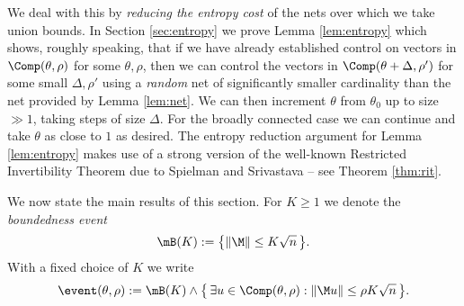 \documentclass[aop,preprint]{imsart}
\theoremstyle{plain}
\newtheorem{proposition}[theorem]{Proposition}
\theoremstyle{definition}
\theoremstyle{remark}
\numberwithin{equation}{section}
\numberwithin{theorem}{section}
\def \tran {\mathsf{T}}
\begin{document}
We deal with this by \emph{reducing the entropy cost} of the nets over which we take union bounds.
In Section \ref{sec:entropy} we prove Lemma \ref{lem:entropy} which shows, roughly speaking, that if we have already established control on vectors in $\Comp(\theta,\rho)$ for some $\theta,\rho$, then we can control the vectors in $\Comp(\theta+\Delta,\rho')$ for some small $\Delta, \rho'$ using a \emph{random} net of significantly smaller cardinality than the net provided by Lemma \ref{lem:net}.
We can then increment $\theta$ from $\theta_0$ up to size $\gg 1$, taking steps of size $\Delta$.
For the broadly connected case we can continue and take $\theta$ as close to $1$ as desired.
The entropy reduction argument for Lemma \ref{lem:entropy} makes use of a strong version of the well-known Restricted Invertibility Theorem due to Spielman and Srivastava -- see Theorem \ref{thm:rit}.

We now state the main results of this section.
For $K\ge1$ we denote the \emph{boundedness event}
\begin{equation}	\label{event:bdd}
\mB(K):= \big\{\|\M\|\le K\sqrt{n}\,\big\}.
\end{equation}
With a fixed choice of $K$ we write
\begin{equation}	\label{def:eventcomp}
\event(\theta,\rho):= \mB(K) \wedge \big\{\, \exists u\in \Comp(\theta,\rho): \|\M u\|\le \rho K \sqrt{n}\,\big\}.
\end{equation}

\begin{comment}
\begin{proposition}[Compressible vectors: broadly connected profile]	\label{prop:slight}
Let $\M=A\circ X+B$ be as in Definition \ref{def:profile} with $n/2\le m\le 2n$.
Assume that $\xi$ has $\kappa$-controlled second moment for some $\kappa\ge1$ (see Definition \ref{def:kappa}), and that for some $\ha,\delta,\nu\in (0,1)$ we have
\begin{enumerate}[(1)]
\item $|\mN_{A(\ha)^\tran}(j)|\ge \delta n$ for all $j\in [m]$; \vspace{.2cm}
\item $|\mN_{A(\ha)^\tran}^{(\delta)}(J)| \ge \min((1+\nu)|J|,n)$ for all $J\subset[m]$. 
\end{enumerate}
Let $K\ge1$.
There is a constant $\rho=\rho(\kappa,\ha,\delta,\nu,K)>0$ such that for any $0<\theta\le (1-\frac\delta4)\min(\frac{n}m,1)$, 
\begin{equation}
\pro{\event(\theta,\rho)}=O(e^{-c_\kappa\delta\ha^2n})
\end{equation}
where $c_\kappa>0$ depends only on $\kappa$ and the implied constant depends only on $\kappa,\ha,\delta,\nu$ and $K$.
\end{proposition}
\end{comment}
\end{document}
